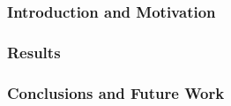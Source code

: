 \begin{frame}
  \frametitle{Introduction and Motivation}
  
        
\end{frame}

\begin{frame}
\frametitle{Results}
    


\end{frame}

\begin{frame}
\frametitle{Conclusions and Future Work}

\end{frame}